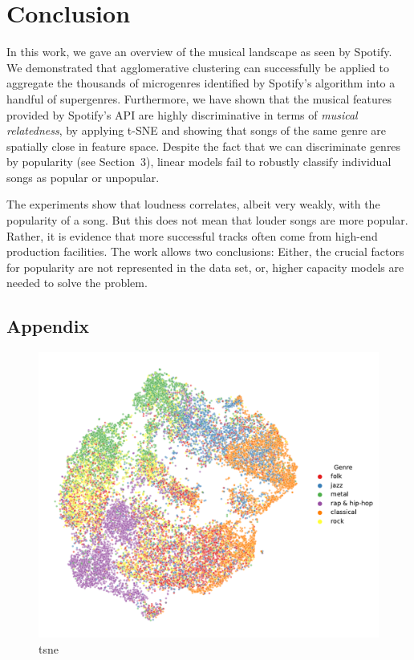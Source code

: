 \documentclass{article}
\begin{document}
\section{Conclusion}

In this work, we gave an overview of the musical landscape as seen by Spotify.
We demonstrated that agglomerative clustering can successfully be applied to aggregate the thousands of microgenres identified by Spotify's algorithm into a handful of supergenres. 
Furthermore, we have shown that the musical features provided by Spotify's API are highly discriminative in terms of \emph{musical relatedness}, by applying t-SNE and showing that songs of the same genre are spatially close in  feature space. 
Despite the fact that we can discriminate genres by popularity (see Section~3), linear models fail to robustly classify individual songs as popular or unpopular.

The experiments show that loudness correlates, albeit very weakly, with the popularity of a song. But this does not mean that louder songs are more popular. Rather, it is evidence that more successful tracks often come from high-end production facilities. 
The work allows two conclusions: Either, the crucial factors for popularity are not represented in the data set, or, higher capacity models are needed to solve the problem.




\begin{appendix}
\section{Appendix}

\newpage

\begin{figure}
  \centering
  \includegraphics[width=1.0\textwidth]{../figures/tsne_genres.pdf}
  \caption{tsne}
  \label{fig:tsne_genres}
\end{figure}

\end{appendix}
\end{document}
